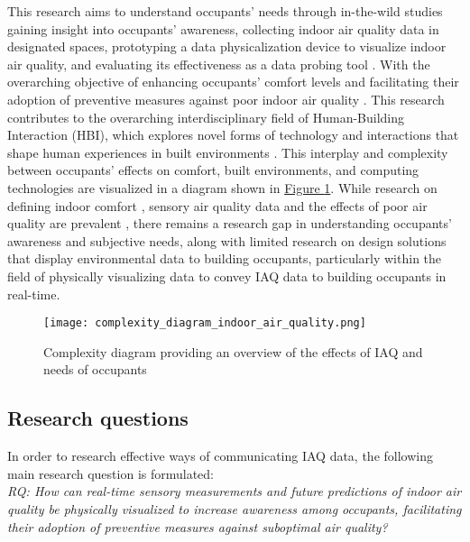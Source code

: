 This research aims to understand occupants' needs through in-the-wild \cite{rogers_moving_2017} studies gaining insight into occupants' awareness, collecting indoor air quality data in designated spaces, prototyping a data physicalization device to visualize indoor air quality, and evaluating its effectiveness as a data probing tool \cite{zimmerman_research_2007}. With the overarching objective of enhancing occupants' comfort levels and facilitating their adoption of preventive measures against poor indoor air quality \cite{zhong_complexity_2021}. This research contributes to the overarching interdisciplinary field of Human-Building Interaction (HBI), which explores novel forms of technology and interactions that shape human experiences in built environments \cite{alavi_introduction_2019}. This interplay and complexity between occupants' effects on comfort, built environments, and computing technologies are visualized in a diagram shown in \hyperref[fig:complexity]{Figure \ref*{fig:complexity}}. While research on defining indoor comfort \cite{alavi_comfort_2017}, sensory air quality data \cite{corlan_importance_2021} and the effects of poor air quality are prevalent \cite{klepeis_national_2001}, there remains a research gap in understanding occupants' awareness and subjective needs, along with limited research on design solutions that display environmental data to building occupants, particularly within the field of physically visualizing data to convey IAQ data to building occupants in real-time.

\begin{figure}[h]
    \centering
    \texttt{[image: complexity\_diagram\_indoor\_air\_quality.png]}
    \caption{Complexity diagram providing an overview of the effects of IAQ and needs of occupants \cite{schweizer_indoor_2007, wang_how_2021, kim_analyzing_2019, alavi_comfort_2017, corlan_importance_2021, klepeis_national_2001}}
    \label{fig:complexity}
\end{figure}


\subsection{Research questions}

In order to research effective ways of communicating  IAQ data, the following main research question is formulated: \\

\emph{RQ: How can real-time sensory measurements and future predictions of indoor air quality be physically visualized to increase awareness among occupants, facilitating their adoption of preventive measures against suboptimal air quality?}\label{rq:1} \\

